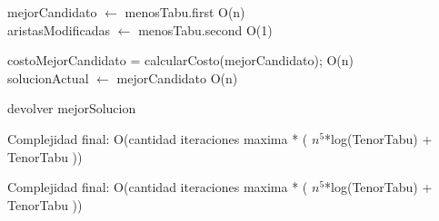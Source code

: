 \begin{algorithm}[H]
{{{		mejorCandidato $\leftarrow$ menosTabu.first \hfill O(n)\\
		aristasModificadas $\leftarrow$ menosTabu.second \hfill O(1)\\
	}  	
	
	costoMejorCandidato = calcularCosto(mejorCandidato); \hfill O(n) \\
	
	solucionActual $\leftarrow$ mejorCandidato \hfill O(n)\\
		

  	

}

devolver mejorSolucion \\

}

Complejidad final: O(cantidad iteraciones maxima * ( $n^5$*log(TenorTabu) + TenorTabu ))

\end{algorithm}

Complejidad final: O(cantidad iteraciones maxima * ( $n^5$*log(TenorTabu) + TenorTabu ))

